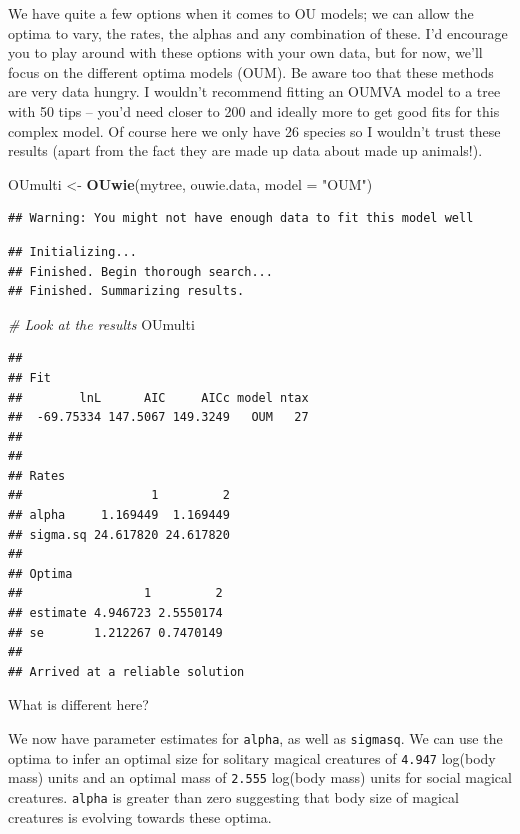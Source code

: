 \documentclass[]{book}
\newenvironment{Shaded}{\begin{snugshade}}{\end{snugshade}}
\newcommand{\KeywordTok}[1]{\textcolor[rgb]{0.13,0.29,0.53}{\textbf{{#1}}}}
\newcommand{\DataTypeTok}[1]{\textcolor[rgb]{0.13,0.29,0.53}{{#1}}}
\newcommand{\StringTok}[1]{\textcolor[rgb]{0.31,0.60,0.02}{{#1}}}
\newcommand{\CommentTok}[1]{\textcolor[rgb]{0.56,0.35,0.01}{\textit{{#1}}}}
\newcommand{\NormalTok}[1]{{#1}}
\theoremstyle{definition}
\theoremstyle{definition}
\theoremstyle{definition}
\theoremstyle{remark}
\begin{document}
We have quite a few options when it comes to OU models; we can allow the
optima to vary, the rates, the alphas and any combination of these. I'd
encourage you to play around with these options with your own data, but
for now, we'll focus on the different optima models (OUM). Be aware too
that these methods are very data hungry. I wouldn't recommend fitting an
OUMVA model to a tree with 50 tips -- you'd need closer to 200 and
ideally more to get good fits for this complex model. Of course here we
only have 26 species so I wouldn't trust these results (apart from the
fact they are made up data about made up animals!).

\begin{Shaded}
\begin{Highlighting}[]
\NormalTok{OUmulti <-}\StringTok{ }\KeywordTok{OUwie}\NormalTok{(mytree, ouwie.data, }\DataTypeTok{model =} \StringTok{"OUM"}\NormalTok{)}
\end{Highlighting}
\end{Shaded}

\begin{verbatim}
## Warning: You might not have enough data to fit this model well
\end{verbatim}

\begin{verbatim}
## Initializing... 
## Finished. Begin thorough search... 
## Finished. Summarizing results.
\end{verbatim}

\begin{Shaded}
\begin{Highlighting}[]
\CommentTok{# Look at the results}
\NormalTok{OUmulti}
\end{Highlighting}
\end{Shaded}

\begin{verbatim}
## 
## Fit
##        lnL      AIC     AICc model ntax
##  -69.75334 147.5067 149.3249   OUM   27
## 
## 
## Rates
##                  1         2
## alpha     1.169449  1.169449
## sigma.sq 24.617820 24.617820
## 
## Optima
##                 1         2
## estimate 4.946723 2.5550174
## se       1.212267 0.7470149
## 
## Arrived at a reliable solution
\end{verbatim}

What is different here?

We now have parameter estimates for \texttt{alpha}, as well as
\texttt{sigmasq}. We can use the optima to infer an optimal size for
solitary magical creatures of \texttt{4.947} log(body mass) units and an
optimal mass of \texttt{2.555} log(body mass) units for social magical
creatures. \texttt{alpha} is greater than zero suggesting that body size
of magical creatures is evolving towards these optima.
\end{document}
